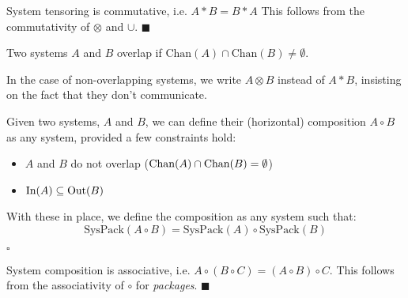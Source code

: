 \begin{lemma}
System tensoring is commutative, i.e. $A * B = B * A$
 This follows from the commutativity of $\otimes$ and $\cup$.
$\blacksquare$
\end{lemma}

\begin{definition}
Two systems $A$ and $B$ overlap if $\text{Chan}(A) \cap \text{Chan}(B) \neq \emptyset$.

In the case of non-overlapping systems, we write $A \otimes B$ instead of $A * B$,
insisting on the fact that they don't communicate.
\end{definition}

\begin{definition}
Given two systems, $A$ and $B$, we can define their (horizontal) composition
$A \circ B$ as any system, provided a few constraints hold:
\begin{itemize}
\item $A$ and $B$ do not overlap ($\text{Chan}(A) \cap \text{Chan}(B) = \emptyset$)
\item $\text{In}(A) \subseteq \text{Out}(B)$
\end{itemize}

With these in place, we define the composition as any system such that:
$$
\text{SysPack}(A \circ B) =
\text{SysPack}(A) \circ \text{SysPack}(B)
$$

$\square$
\end{definition}

\begin{lemma}
System composition is associative, i.e. $A \circ (B \circ C) = (A \circ B) \circ C$.
 This follows from the associativity of $\circ$ for \emph{packages}. $\blacksquare$
\end{lemma}

